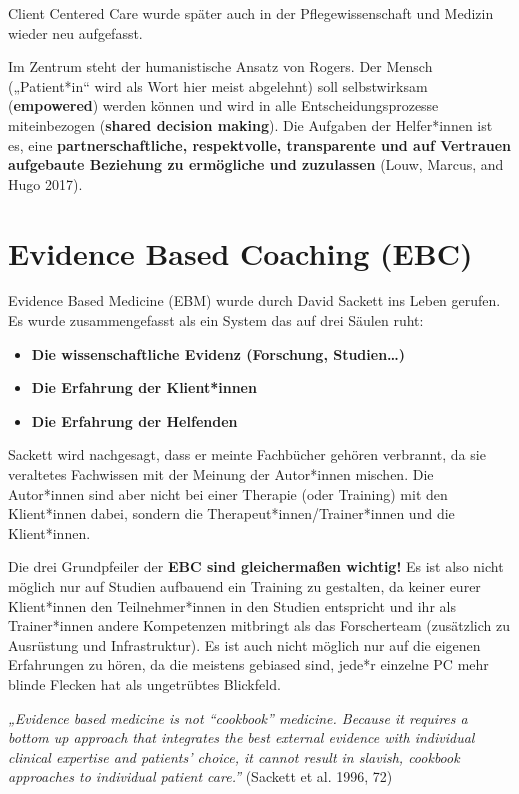 \documentclass[
  letterpaper,
  DIV=11,
  numbers=noendperiod]{scrreprt}
\providecommand{\tightlist}{%
  \setlength{\itemsep}{0pt}\setlength{\parskip}{0pt}}
\begin{document}
Client Centered Care wurde später auch in der Pflegewissenschaft und
Medizin wieder neu aufgefasst.

Im Zentrum steht der humanistische Ansatz von Rogers. Der Mensch
(„Patient*in`` wird als Wort hier meist abgelehnt) soll selbstwirksam
(\textbf{empowered}) werden können und wird in alle
Entscheidungsprozesse miteinbezogen (\textbf{shared decision making}).
Die Aufgaben der Helfer*innen ist es, eine \textbf{partnerschaftliche,
respektvolle, transparente und auf Vertrauen aufgebaute Beziehung zu
ermögliche und zuzulassen} (Louw, Marcus, and Hugo 2017).

\section{Evidence Based Coaching (EBC)}\label{sec-EBM}

Evidence Based Medicine (EBM) wurde durch David Sackett ins Leben
gerufen. Es wurde zusammengefasst als ein System das auf drei Säulen
ruht:

\begin{itemize}
\tightlist
\item
  \textbf{Die wissenschaftliche Evidenz (Forschung, Studien\ldots)}
\item
  \textbf{Die Erfahrung der Klient*innen}
\item
  \textbf{Die Erfahrung der Helfenden}
\end{itemize}

Sackett wird nachgesagt, dass er meinte Fachbücher gehören verbrannt, da
sie veraltetes Fachwissen mit der Meinung der Autor*innen mischen. Die
Autor*innen sind aber nicht bei einer Therapie (oder Training) mit den
Klient*innen dabei, sondern die Therapeut*innen/Trainer*innen und die
Klient*innen.

Die drei Grundpfeiler der \textbf{EBC sind gleichermaßen wichtig!} Es
ist also nicht möglich nur auf Studien aufbauend ein Training zu
gestalten, da keiner eurer Klient*innen den Teilnehmer*innen in den
Studien entspricht und ihr als Trainer*innen andere Kompetenzen
mitbringt als das Forscherteam (zusätzlich zu Ausrüstung und
Infrastruktur). Es ist auch nicht möglich nur auf die eigenen
Erfahrungen zu hören, da die meistens gebiased sind, jede*r einzelne PC
mehr blinde Flecken hat als ungetrübtes Blickfeld.

\emph{„Evidence based medicine is not ``cookbook'' medicine. Because it
requires a bottom up approach that integrates the best external evidence
with individual clinical expertise and patients' choice, it cannot
result in slavish, cookbook approaches to individual patient care.''}
(Sackett et al. 1996, 72)
\end{document}

